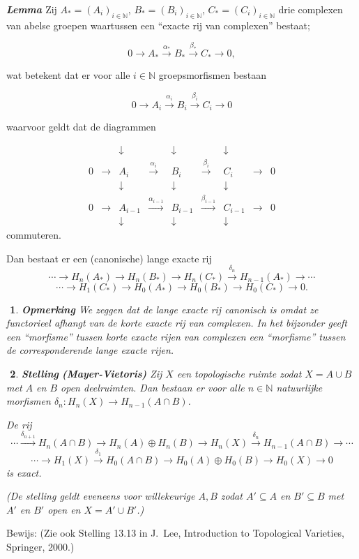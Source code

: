 \documentclass[12pt]{book}
\newcommand{\N}{\mathbb{N}}
\newcommand{\bew}{{\sc Bewijs: }}
\newtheorem{stelh}{$\!\!$}[section]
\newenvironment{stel}{\begin{stelh}{\em {\bf Stelling }}}{\end{stelh}}
\newenvironment{lem}{\begin{lemh}{\em {\bf Lemma }}}{\end{lemh}}
\newtheorem{opmh}[stelh]{$\!\!$}
\newenvironment{eopm}{\begin{opmh} \em {\bf Opmerking }}{\end{opmh}}
\begin{document}
\begin{lem}
Zij $A_{*}=(A_i)_{i\in \N}$, $B_{*}=(B_i)_{i\in \N}$, $C_{*}=(C_i)_{i\in \N}$ drie complexen van abelse
groepen waartussen een ``exacte rij van complexen'' bestaat;

$$0\to A_* \stackrel{\alpha_{*}}{\to} B_* \stackrel{\beta_{*}}{\to} C_*\to 0,$$

wat betekent dat er voor alle $i\in \N$ groepsmorfismen bestaan

$$0\to A_i \stackrel{\alpha_{i}}{\to} B_{i} \stackrel{\beta_{i}}{\to} C_{i}\to 0$$

waarvoor geldt dat de diagrammen

$$\begin{array}{ccccccccc}
 & & \downarrow & &\downarrow & & \downarrow & & \\
 0 & \to & A_i & \stackrel{\alpha_{i}}{\to} & B_i & \stackrel{\beta_{i}}{\to} & C_i & \to & 0\\
 & & \downarrow & & \downarrow & & \downarrow & & \\
  0 & \to & A_{i-1} &\stackrel{\alpha_{i-1}}{\to} & B_{i-1} & \stackrel{\beta_{i-1}}{\to} & C_{i-1} & \to & 0\\
 & & \downarrow & & \downarrow & &\downarrow & & \end{array}$$
 commuteren.

 Dan bestaat er een (canonische) lange exacte rij
 $$\cdots \to H_{n}(A_*) \to H_{n}(B_{*}) \to H_{n}(C_{*})
\stackrel{\delta_{n}}{\to} H_{n-1}(A_*)\to \cdots $$
$$\cdots \to H_{1}(C_{*}) \to H_{0}(A_{*})\to H_{0}(B_{*})\to H_{0}(C_{*})\to 0.$$
\label{diagjacht}\end{lem}

\begin{eopm}
We zeggen dat de lange exacte rij canonisch is omdat ze functorieel afhangt van de korte exacte rij van complexen.
In het bijzonder geeft een ``morfisme'' tussen korte exacte rijen van complexen een ``morfisme'' tussen de
corresponderende lange exacte rijen.
\end{eopm}

\begin{stel}{\textbf{\em(Mayer-Vietoris)}} \label{mayvie}
Zij $X$ een topologische ruimte zodat $X=A\cup B$ met $A$ en $B$ open deelruimten. Dan bestaan er
voor alle $n\in \N$ natuurlijke morfismen $\delta_{n}:H_{n}(X)\to H_{n-1}(A\cap B)$.

De rij
$$\cdots \stackrel{\delta_{n+1}}{\to} H_{n}(A\cap B) \to H_{n}(A)\oplus H_{n}(B) \to H_{n}(X)
\stackrel{\delta_{n}}{\to} H_{n-1}(A\cap B) \to \cdots $$
$$\cdots \to H_{1}(X)\stackrel{\delta_{1}}{\to} H_{0}(A\cap B)\to H_{0}(A)\oplus H_{0}(B)\to
H_{0}(X)\to 0$$
is exact.

(De stelling geldt eveneens voor willekeurige $A,B$ zodat $A'\subseteq A$ en $B'\subseteq B$ met $A'$ en
$B'$ open en $X=A'\cup B'$.)
\end{stel}
\bew (Zie ook Stelling 13.13 in J.\ Lee, Introduction to Topological Varieties, Springer, 2000.)
\end{document}
